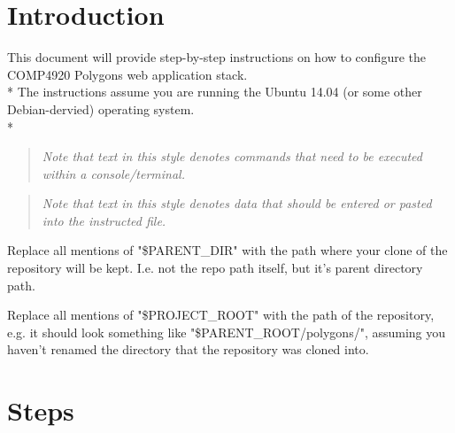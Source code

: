\documentclass[12pt]{article}
\newenvironment{command}
   { 
      \begin{quote}\itshape
      \color{blue}
   }
   { \end{quote} }
\newenvironment{data}
   { 
      \begin{quote}\itshape
      \color{red}
   }
   { \end{quote} }
\begin{document}
\section{Introduction}
This document will provide step-by-step instructions on how to configure the
COMP4920 Polygons web application stack. \\*
The instructions assume you are running the Ubuntu 14.04 (or some other
Debian-dervied) operating system. \\*

\begin{command} Note that text in this style denotes commands that need to be
executed within a console/terminal. \end{command}

\begin{data} Note that text in this style denotes data that should be entered or
pasted into the instructed file. \end{data}

Replace all mentions of "\$PARENT\_DIR" with the path where your clone of the
repository will be kept. I.e. not the repo path itself, but it's parent
directory path.

Replace all mentions of "\$PROJECT\_ROOT" with the path of the repository, e.g.
it should look something like "\$PARENT\_ROOT/polygons/", assuming you haven't
renamed the directory that the repository was cloned into.

\section{Steps}
\end{document}
